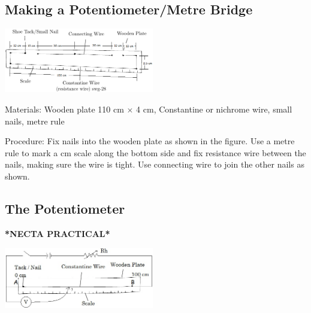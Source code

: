 \begin{multicols}{2}
\vfill
\columnbreak

\subsection{Making a Potentiometer/Metre Bridge}

\begin{center}
\includegraphics[width=0.49\textwidth]{./img/metre-bridge-2.png}
\end{center}

\begin{description*}
\item[Materials:]{Wooden plate 110 cm $\times$ 4 cm, Constantine or nichrome wire, small nails, metre rule}
\item[Procedure:]{Fix nails into the wooden plate as shown in the figure. Use a metre rule to mark a cm scale along the bottom side and fix resistance wire between the nails, making sure the wire is tight. Use connecting wire to join the other nails as shown.}
\end{description*}

\subsection{The Potentiometer}
\textbf{*NECTA PRACTICAL*}

\begin{center}
\includegraphics[width=0.49\textwidth]{./img/potentiometer.jpg}
\end{center}


\end{multicols}
